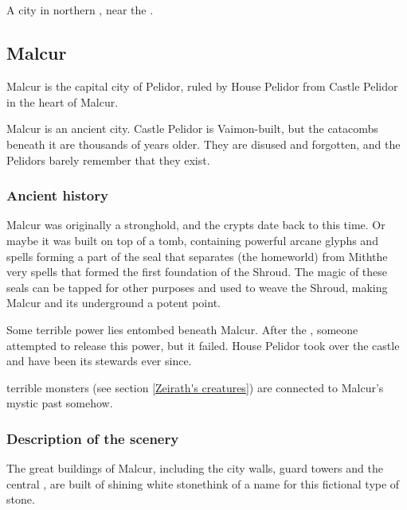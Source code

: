 \subsection{\Forklin}
\label{Forklin}
\label{\Forklin{}}
A city in northern , near the .









\subsection{Malcur}
\label{Malcur}
Malcur is the capital city of Pelidor, ruled by House Pelidor from Castle Pelidor in the heart of Malcur. 

Malcur is an ancient city. Castle Pelidor is Vaimon-built, but the catacombs beneath it are thousands of years older. They are disused and forgotten, and the Pelidors barely remember that they exist. %





\subsubsection{Ancient history}
\label{Ancient history of Malcur}
Malcur was originally a \thzantzaic{} stronghold, and the crypts date back to this time. Or maybe it was built on top of a \thzantzai{} tomb, containing powerful arcane glyphs and spells forming a part of the seal that separates \Machai{} (the \thzantzaic{} homeworld) from Mith\dash the very spells that formed the first foundation of the Shroud. The magic of these seals can be tapped for other purposes and used to weave the Shroud, making Malcur and its underground a potent \nexus{} point. 

Some terrible power lies entombed beneath Malcur. After the \Darkfall, someone attempted to release this power, but it failed. House Pelidor took over the castle and have been its stewards ever since. 

\Zeirathz{} terrible monsters (see section \ref{Zeirath's creatures}) are connected to Malcur's mystic past somehow.





\subsubsection{Description of the scenery}
The great buildings of Malcur, including the city walls, guard towers and the central \CastlePelidor, are built of shining white stone\dash think of a name for this fictional type of stone. 

